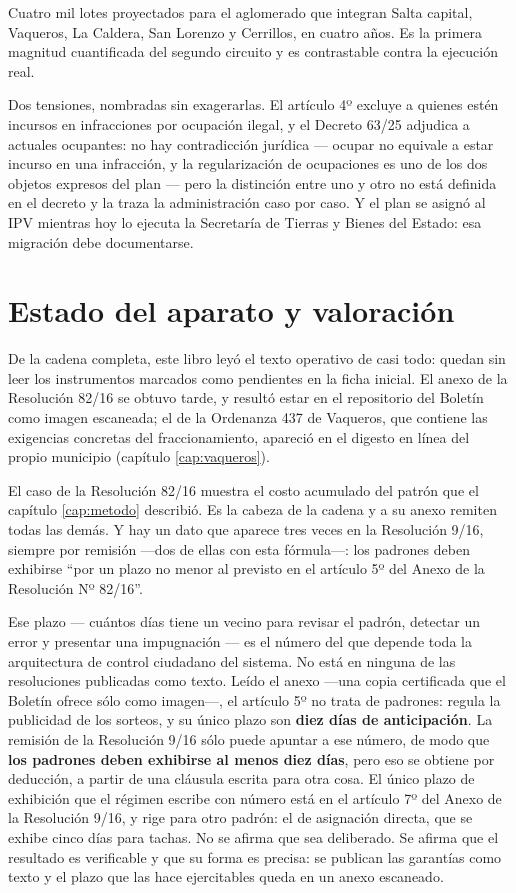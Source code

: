 Cuatro mil lotes proyectados para el aglomerado que integran Salta capital, Vaqueros, La Caldera, San Lorenzo y Cerrillos, en cuatro años. Es la primera magnitud cuantificada del segundo circuito y es contrastable contra la ejecución real.

Dos tensiones, nombradas sin exagerarlas. El artículo 4º excluye a quienes estén incursos en infracciones por ocupación ilegal, y el Decreto 63/25 adjudica a actuales ocupantes: no hay contradicción jurídica --- ocupar no equivale a estar incurso en una infracción, y la regularización de ocupaciones es uno de los dos objetos expresos del plan --- pero la distinción entre uno y otro no está definida en el decreto y la traza la administración caso por caso. Y el plan se asignó al IPV mientras hoy lo ejecuta la Secretaría de Tierras y Bienes del Estado: esa migración debe documentarse.

\section{Estado del aparato y valoración}

De la cadena completa, este libro leyó el texto operativo de casi todo: quedan sin leer los instrumentos marcados como pendientes en la ficha inicial. El anexo de la Resolución 82/16 se obtuvo tarde, y resultó estar en el repositorio del Boletín como imagen escaneada; el de la Ordenanza 437 de Vaqueros, que contiene las exigencias concretas del fraccionamiento, apareció en el digesto en línea del propio municipio (capítulo \ref{cap:vaqueros}).

\begin{cautela}
El caso de la Resolución 82/16 muestra el costo acumulado del patrón que el capítulo \ref{cap:metodo} describió. Es la cabeza de la cadena y a su anexo remiten todas las demás. Y hay un dato que aparece tres veces en la Resolución 9/16, siempre por remisión ---dos de ellas con esta fórmula---: los padrones deben exhibirse ``por un plazo no menor al previsto en el artículo 5º del Anexo de la Resolución Nº 82/16''.

Ese plazo --- cuántos días tiene un vecino para revisar el padrón, detectar un error y presentar una impugnación --- es el número del que depende toda la arquitectura de control ciudadano del sistema. No está en ninguna de las resoluciones publicadas como texto. Leído el anexo ---una copia certificada que el Boletín ofrece sólo como imagen---, el artículo 5º no trata de padrones: regula la publicidad de los sorteos, y su único plazo son \textbf{diez días de anticipación}. La remisión de la Resolución 9/16 sólo puede apuntar a ese número, de modo que \textbf{los padrones deben exhibirse al menos diez días}, pero eso se obtiene por deducción, a partir de una cláusula escrita para otra cosa. El único plazo de exhibición que el régimen escribe con número está en el artículo 7º del Anexo de la Resolución 9/16, y rige para otro padrón: el de asignación directa, que se exhibe cinco días para tachas. No se afirma que sea deliberado. Se afirma que el resultado es verificable y que su forma es precisa: se publican las garantías como texto y el plazo que las hace ejercitables queda en un anexo escaneado.
\end{cautela}

